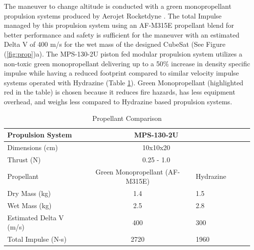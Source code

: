 The maneuver to change altitude is conducted with a green monopropellant propulsion systems produced by Aerojet Rocketdyne \cite{Vacco}. The total Impulse managed by this propulsion system using an AF-M315E propellant blend for better performance and safety is sufficient for the maneuver with an estimated Delta V of 400 m/s for the wet mass of the designed CubeSat (See Figure (\ref{fig:prop})a). The MPS-130-2U piston \cite{SatCatalog} fed modular propulsion system utilizes a non-toxic green monopropellant delivering up to a 50\%  increase in density specific impulse while having a reduced footprint compared to similar velocity impulse systems operated with Hydrazine (Table \ref{Tab:Prop}). Green Monopropellant (highlighted red in the table) is chosen because it reduces fire hazards, has less equipment overhead, and weighs less compared to Hydrazine based propulsion systems. \\

\begin{table}[!ht]
\centering
\caption{Propellant Comparison}
\begin{tabular}{l|c|l|c|l|c|}
\rowcolor[HTML]{C0C0C0} 
Propulsion System        & \multicolumn{2}{c}{MPS-130-2U} \\ \hline
Dimensions (cm)          & \multicolumn{2}{c}{10x10x20} \\
Thrust (N)               & \multicolumn{2}{c}{0.25 - 1.0}   \\ 
Propellant               & \cellcolor{red!20}Green Monopropellant (AF-M315E)   & Hydrazine\\ \hline
Dry Mass (kg)            & \cellcolor{red!20}1.4                               & 1.5  \\
Wet Mass (kg)            & \cellcolor{red!20}2.5                               & 2.8  \\
Estimated Delta V (m/s)  & \cellcolor{red!20}400                               & 300  \\ 
Total Impulse (N-s)      & \cellcolor{red!20}2720                              & 1960 \\ \hline
\end{tabular}
\label{Tab:Prop}
\end{table}

